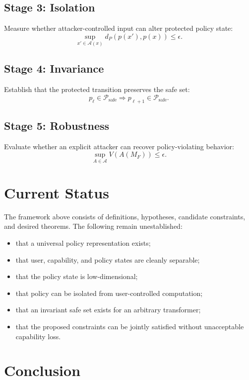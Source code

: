 \documentclass[11pt]{article}
\newcommand{\A}{\mathcal{A}}
\newcommand{\Psafe}{\mathcal{P}_{\mathrm{safe}}}
\begin{document}
\subsection{Stage 3: Isolation}
Measure whether attacker-controlled input can alter protected policy state:
\begin{equation}
\sup_{x'\in\A(x)}d_P(p(x'),p(x))\leq\epsilon.
\end{equation}

\subsection{Stage 4: Invariance}
Establish that the protected transition preserves the safe set:
\begin{equation}
p_\ell\in\Psafe\Longrightarrow p_{\ell+1}\in\Psafe.
\end{equation}

\subsection{Stage 5: Robustness}
Evaluate whether an explicit attacker can recover policy-violating behavior:
\begin{equation}
\sup_{A\in\mathcal A}V(A(M_F))\leq\epsilon.
\end{equation}

\section{Current Status}

The framework above consists of definitions, hypotheses, candidate
constraints, and desired theorems. The following remain unestablished:
\begin{itemize}
\item that a universal policy representation exists;
\item that user, capability, and policy states are cleanly separable;
\item that the policy state is low-dimensional;
\item that policy can be isolated from user-controlled computation;
\item that an invariant safe set exists for an arbitrary transformer;
\item that the proposed constraints can be jointly satisfied without
unacceptable capability loss.
\end{itemize}

\section{Conclusion}
\end{document}

